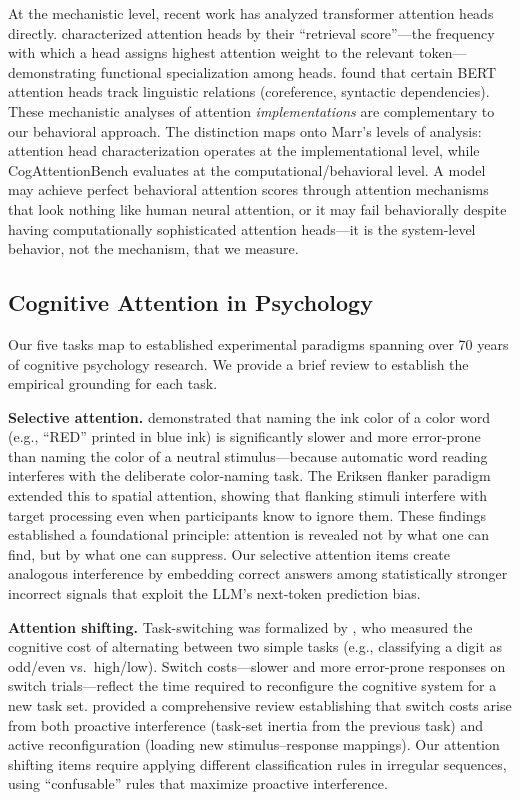 \documentclass{article}
\begin{document}
At the mechanistic level, recent work has analyzed transformer attention heads directly. \citet{wu2025} characterized attention heads by their ``retrieval score''---the frequency with which a head assigns highest attention weight to the relevant token---demonstrating functional specialization among heads. \citet{clark2019} found that certain BERT attention heads track linguistic relations (coreference, syntactic dependencies). These mechanistic analyses of attention \emph{implementations} are complementary to our behavioral approach. The distinction maps onto Marr's \citep{marr1982} levels of analysis: attention head characterization operates at the implementational level, while CogAttentionBench evaluates at the computational/behavioral level. A model may achieve perfect behavioral attention scores through attention mechanisms that look nothing like human neural attention, or it may fail behaviorally despite having computationally sophisticated attention heads---it is the system-level behavior, not the mechanism, that we measure.

\subsection{Cognitive Attention in Psychology}

Our five tasks map to established experimental paradigms spanning over 70 years of cognitive psychology research. We provide a brief review to establish the empirical grounding for each task.

\textbf{Selective attention.} \citet{stroop1935} demonstrated that naming the ink color of a color word (e.g., ``RED'' printed in blue ink) is significantly slower and more error-prone than naming the color of a neutral stimulus---because automatic word reading interferes with the deliberate color-naming task. The Eriksen flanker paradigm \citep{eriksen1974} extended this to spatial attention, showing that flanking stimuli interfere with target processing even when participants know to ignore them. These findings established a foundational principle: attention is revealed not by what one can find, but by what one can suppress. Our selective attention items create analogous interference by embedding correct answers among statistically stronger incorrect signals that exploit the LLM's next-token prediction bias.

\textbf{Attention shifting.} Task-switching was formalized by \citet{rogers1995}, who measured the cognitive cost of alternating between two simple tasks (e.g., classifying a digit as odd/even vs.\ high/low). Switch costs---slower and more error-prone responses on switch trials---reflect the time required to reconfigure the cognitive system for a new task set. \citet{monsell2003} provided a comprehensive review establishing that switch costs arise from both proactive interference (task-set inertia from the previous task) and active reconfiguration (loading new stimulus--response mappings). Our attention shifting items require applying different classification rules in irregular sequences, using ``confusable'' rules that maximize proactive interference.
\end{document}
